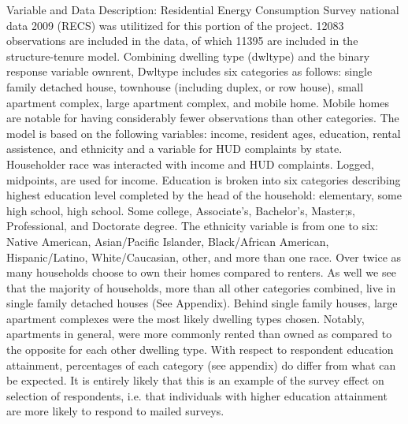 \documentclass{article}
\begin{document}
Variable and Data Description: 
Residential Energy Consumption Survey national data 2009 (RECS) was utilitized for this portion of the project. 12083 observations are included in the data, of which 11395 are included in the structure-tenure model. Combining dwelling type (dwltype) and the binary response variable ownrent, Dwltype includes six categories as follows: single family detached house, townhouse (including duplex, or row house), small apartment complex, large apartment complex, and mobile home. Mobile homes are notable for having considerably fewer observations than other categories. The model is based on the following variables: income, resident ages, education, rental assistence, and ethnicity and a variable for HUD complaints by state.  Householder race was interacted with income and  HUD complaints.  Logged, midpoints, are used for income. Education is broken into six categories describing highest education level completed by the head of the household: elementary, some high school, high school. Some college, Associate’s, Bachelor’s, Master;s, Professional, and Doctorate degree.  The ethnicity variable is from one to six: Native American, Asian/Pacific Islander, Black/African American, Hispanic/Latino, White/Caucasian, other, and more than one race.  
  Over twice as many households choose to own their homes compared to renters.  As well we see that the majority of households, more than all other categories combined, live in single family detached houses (See Appendix).  Behind single family houses, large apartment complexes were the most likely dwelling types chosen.  Notably, apartments in general, were more commonly rented than owned as compared to the opposite for each other dwelling type.
	With respect to respondent education attainment, percentages of each category (see appendix) do differ from what can be expected.  It is entirely likely that this is an example of the survey effect on selection of respondents, i.e. that individuals with higher education attainment are more likely to respond to mailed surveys.   	
\end{document}
